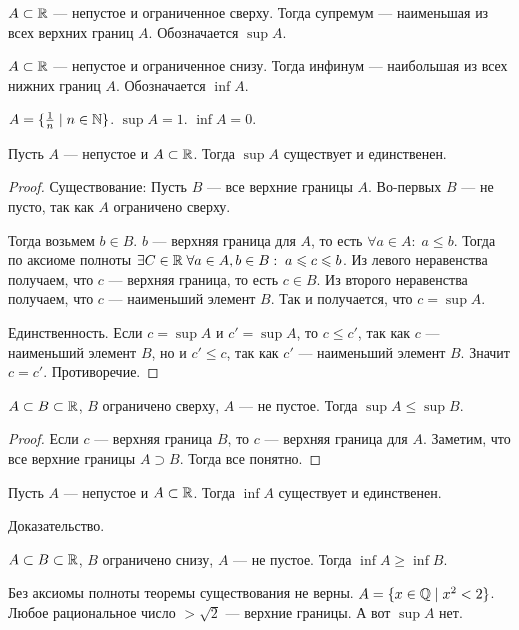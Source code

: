 \begin{definition}
    $A \subset \mathbb{R}$ --- непустое и ограниченное сверху. Тогда супремум --- наименьшая из всех верхних границ  $A$. Обозначается  $\sup A$.
\end{definition}
\begin{definition}
    $A \subset \mathbb{R}$ --- непустое и ограниченное снизу. Тогда инфинум --- наибольшая из всех нижних границ  $A$. Обозначается  $\inf A$.
\end{definition}
\begin{example}
    $A = \{\frac{1}{n} \mid n \in \mathbb{N}\}$. $\sup A = 1$.  $\inf A = 0$. 
\end{example}
\begin{theorem}
    Пусть $A$ --- непустое и  $A \subset \mathbb{R}$. Тогда  $\sup A$ существует и единственен. 
\end{theorem}
\begin{proof}
    Существование:
    Пусть $B$ --- все верхние границы $A$. Во-первых $B$ --- не пусто, так как $A$ ограничено сверху.

    Тогда возьмем  $b \in B$. $b$ --- верхняя граница для  $A$, то есть  $\forall a \in A: \; a \le b$. Тогда по аксиоме полноты $\exists C \in \mathbb{R} \; \forall a \in A, b \in B: \; a \leqslant c \leqslant b$. Из левого неравенства получаем, что $c$ --- верхняя граница, то есть  $c \in B$. Из второго неравенства получаем, что  $c$ --- наименьший элемент $B$. Так и получается, что  $c = \sup A$.

    Единственность. Если $c = \sup A$ и  $c' = \sup A$, то  $c \le c'$, так как $c$ --- наименьший элемент  $B$, но и  $c' \le c$, так как $c'$ --- наименьший элемент $B$. Значит  $c = c'$. Противоречие.
\end{proof}
\begin{consequence}
    $A \subset B \subset \mathbb{R}$,  $B$ ограничено сверху,  $A$ --- не пустое. Тогда  $\sup A \le \sup B$.
\end{consequence}
\begin{proof}
    Если $c$ --- верхняя граница  $B$, то  $c$ --- верхняя граница для  $A$. Заметим, что все верхние границы  $A \supset B$. Тогда все понятно. 
\end{proof}

\begin{theorem}
    Пусть $A$ --- непустое и  $A \subset \mathbb{R}$. Тогда  $\inf A$ существует и единственен. 
\end{theorem}
\begin{exerc}
    Доказательство. 
\end{exerc}
\begin{consequence}
    $A \subset B \subset \mathbb{R}$,  $B$ ограничено снизу,  $A$ --- не пустое. Тогда  $\inf A \ge \inf B$.
\end{consequence}
\begin{remark}
    Без аксиомы полноты теоремы существования не верны. $A = \{x \in \mathbb{Q}\mid x^2 < 2\}$. Любое рациональное число  $>\sqrt{2}$ --- верхние границы. А вот  $\sup A$ нет.
\end{remark}

